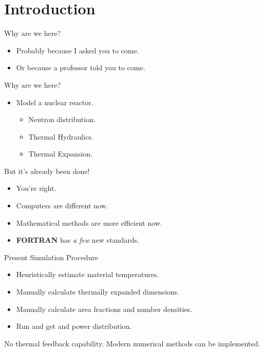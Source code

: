 \section{Introduction}
\label{sec:introduction}

\begin{frame}{Why are we here?}
  \pause
  \begin{itemize}
    \item Probably because I asked you to come.
    \item Or because a professor told you to come.
  \end{itemize}
\end{frame}

\begin{frame}{Why are we here?}
  \begin{itemize}
    \item {\huge Model a nuclear reactor.}
      \pause
      \begin{itemize}
        \item Neutron distribution.
        \item Thermal Hydraulics.
        \item Thermal Expansion.
      \end{itemize}
  \end{itemize}
\end{frame}

\begin{frame}{But it's already been done!}
  \begin{itemize}
    \pause 
    \item You're right.
    \pause
    \item Computers are different now.
    \item Mathematical methods are more efficient now.
    \item \textbf{FORTRAN} has \textit{a few} new standards.
  \end{itemize}
\end{frame}

\begin{frame}{Present Simulation Procedure}
  \begin{itemize}
    \item Heuristically estimate material temperatures.
    \item Manually calculate thermally expanded dimensions.
    \item Manually calculate area fractions and number densities.
    \item Run \dif and get \keff and power distribution.
    \pause
  \end{itemize}
  \vspace{0.3in}
  \begin{block}{}
    No thermal feedback capability. Modern numerical methods can be
    implemented.
  \end{block}
\end{frame}

